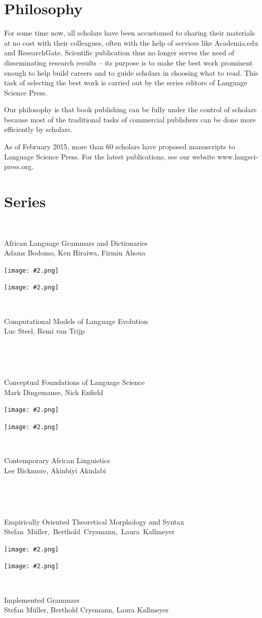 \documentclass[
notumble,
nofoldmark,
]{leaflet}
\begin{document}
 \section{\sffamily\Large Philosophy}
 \parbox{\textwidth}{
 For some time now, all scholars have been accustomed to sharing their materials at no cost with their colleagues, often with the help of services like Academia.edu and ResearchGate. Scientific publication thus no longer serves the need of disseminating research results -- its purpose is to make the best work prominent enough to help build careers and to guide scholars in choosing what to read. This task of selecting the best work is carried out by the series editors of Language Science Press.

 Our philosophy is that book publishing can be fully under the control of scholars because most of the traditional tasks of commercial publishers can be done more efficiently by scholars. 
 
As of February 2015, more than 60 scholars have proposed manuscripts to Language Science Press. For the latest publications, see our website www.langsci-press.org.
 }
\newpage 

\section{\sffamily\Large Series}

\newcommand{\leftseries}[3]{   
  \parbox{.1\textwidth}{~}
  \parbox{.7\textwidth}{\raggedleft\small #1\\{\scriptsize #3}}
  \parbox{.1\textwidth}{\texttt{[image: \#2.png]}} 
}

\newcommand{\rightseries}[3]{   
  \parbox{.1\textwidth}{\texttt{[image: \#2.png]}}
  \parbox{.01\textwidth}{~} 
  \parbox{.7\textwidth}{\raggedright\small #1\\{\scriptsize #3}}
  \parbox{.05\textwidth}{~} 
}

\leftseries{African Language Grammars and Dictionaries}{algad}{Adams Bodomo, Ken Hiraiwa, Firmin Ahoua}
\rightseries{Computational Models of Language Evolution}{cmle}{Luc Steel, Remi van Trijp}

\leftseries{Conceptual Foundations of Language Science}{cfls}{Mark Dingemanse, Nick Enfield}
\rightseries{Contemporary African Linguistics}{cal}{Lee Bickmore, Akinbiyi Akinlabi}

\leftseries{Empirically Oriented Theoretical Morphology and Syntax}{eotms}{\mbox{Stefan M\"uller, Berthold Crysmann, Laura Kallmeyer}}
\rightseries{Implemented Grammars}{eotms-ig}{Stefan M\"uller, Berthold Crysmann, Laura Kallmeyer}
\end{document}
